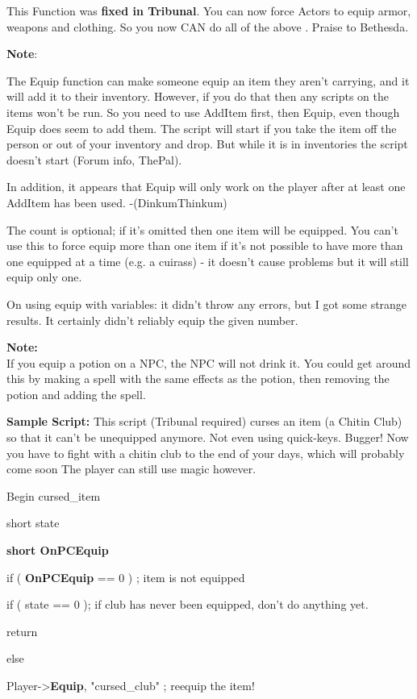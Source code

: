 \documentclass[
]{article}
\begin{document}
This Function was \textbf{fixed in Tribunal}. You can now force Actors
to equip armor, weapons and clothing. So you now CAN do all of the above
. Praise to Bethesda.

\textbf{Note}:

The Equip function can make someone equip an item they aren't carrying,
and it will add it to their inventory. However, if you do that then any
scripts on the items won't be run. So you need to use AddItem first,
then Equip, even though Equip does seem to add them. The script will
start if you take the item off the person or out of your inventory and
drop. But while it is in inventories the script doesn't start (Forum
info, ThePal).

In addition, it appears that Equip will only work on the player after at
least one AddItem has been used. -(DinkumThinkum)

The count is optional; if it's omitted then one item will be equipped.
You can't use this to force equip more than one item if it's not
possible to have more than one equipped at a time (e.g. a cuirass) - it
doesn't cause problems but it will still equip only one.

On using equip with variables: it didn't throw any errors, but I got
some strange results. It certainly didn't reliably equip the given
number.

\textbf{Note:\\
}If you equip a potion on a NPC, the NPC will not drink it. You could
get around this by making a spell with the same effects as the potion,
then removing the potion and adding the spell.\textbf{\hfill\break
}

\textbf{Sample Script:} This script (Tribunal required) curses an item
(a Chitin Club) so that it can't be unequipped anymore. Not even using
quick-keys. Bugger! Now you have to fight with a chitin club to the end
of your days, which will probably come soon The player can still use
magic however.

Begin cursed\_item

short state

\textbf{short OnPCEquip}

if ( \textbf{OnPCEquip} == 0 ) ; item is not equipped

if ( state == 0 ); if club has never been equipped, don't do anything
yet.

return

else

Player-\textgreater{}\textbf{Equip}, "cursed\_club" ; reequip the item!
\end{document}
